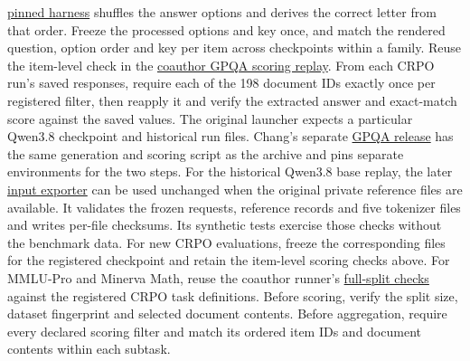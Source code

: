 \documentclass[11pt]{article}
\begin{document}
\begin{itemize}
\href{https://github.com/EleutherAI/lm-evaluation-harness/blob/d6de81643928d653435c431bae19945d41d32520/lm_eval/tasks/gpqa/cot_zeroshot/utils.py}{pinned harness} shuffles the answer options and derives the correct letter from that order. Freeze the processed options and key once, and match the rendered question, option order and key per item across checkpoints within a family. Reuse the item-level check in the \href{https://github.com/0315jaewon/SecPO-test/blob/42280080f0f9224717f40a53928a761e554e1db0/scripts/lambda_gpqa.py#L239-L282}{coauthor GPQA scoring replay}. From each CRPO run’s saved responses, require each of the 198 document IDs exactly once per registered filter, then reapply it and verify the extracted answer and exact-match score against the saved values. The original launcher expects a particular Qwen3.8 checkpoint and historical run files. Chang's separate \href{https://github.com/0315jaewon/SecPO-test/blob/d009be8d9779f05cd475b3e7a490e829fff12d64/docs/LAMBDA_GPQA.md}{GPQA release} has the same generation and scoring script as the archive and pins separate environments for the two steps. For the historical Qwen3.8 base replay, the later \href{https://github.com/0315jaewon/SecPO-test/blob/d009be8d9779f05cd475b3e7a490e829fff12d64/scripts/export_lambda_gpqa_bundle.py}{input exporter} can be used unchanged when the original private reference files are available. It validates the frozen requests, reference records and five tokenizer files and writes per-file checksums. Its synthetic tests exercise those checks without the benchmark data. For new CRPO evaluations, freeze the corresponding files for the registered checkpoint and retain the item-level scoring checks above. For MMLU-Pro and Minerva Math, reuse the coauthor runner’s \href{https://github.com/0315jaewon/SecPO-test/blob/42280080f0f9224717f40a53928a761e554e1db0/scripts/evaluate_lambda_full_lm.py}{full-split checks} against the registered CRPO task definitions. Before scoring, verify the split size, dataset fingerprint and selected document contents. Before aggregation, require every declared scoring filter and match its ordered item IDs and document contents within each subtask.

\end{itemize}
\end{document}
